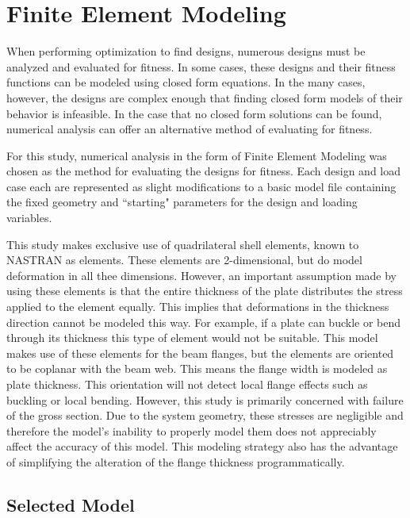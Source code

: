 \section{Finite Element Modeling}

When performing optimization to find designs, numerous designs must be analyzed and evaluated for fitness. In some cases, these designs and their fitness functions can be modeled using closed form equations. In the many cases, however, the designs are complex enough that finding closed form models of their behavior is infeasible. In the case that no closed form solutions can be found, numerical analysis can offer an alternative method of evaluating for fitness. 

For this study, numerical analysis in the form of Finite Element Modeling was chosen as the method for evaluating the designs for fitness. Each design and load case each are represented as slight modifications to a basic model file containing the fixed geometry and ``starting" parameters for the design and loading variables.  

This study makes exclusive use of quadrilateral shell elements, known to NASTRAN as  elements. These elements are 2-dimensional, but do model deformation in all thee dimensions. However, an important assumption made by using these elements is that the entire thickness of the plate distributes the stress applied to the element equally. This implies that deformations in the thickness direction cannot be modeled this way. For example, if a plate can buckle or bend through its thickness this type of element would not be suitable. This model makes use of these elements for the beam flanges, but the elements are oriented to be coplanar with the beam web. This means the flange width is modeled as plate thickness. This orientation will not detect local flange effects such as buckling or local bending. However, this study is primarily concerned with failure of the gross section. Due to the system geometry, these stresses are negligible and therefore the model's inability to properly model them does not appreciably affect the accuracy of this model. This modeling strategy also has the advantage of simplifying the alteration of the flange thickness programmatically. 

\subsection{Selected Model}
\label{sec:model}

